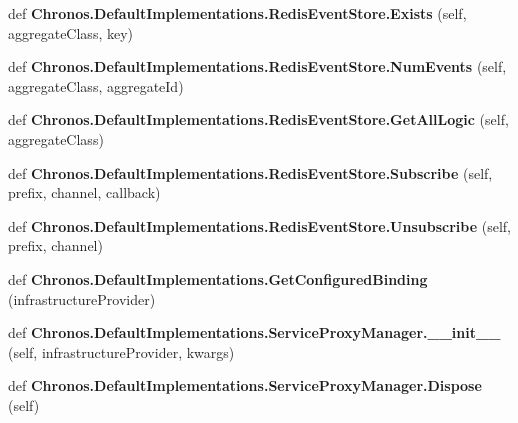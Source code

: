 \begin{DoxyCompactItemize}
\item 
def {\bfseries Chronos.\+Default\+Implementations.\+Redis\+Event\+Store.\+Exists} (self, aggregate\+Class, key)\hypertarget{group__Chronos_ga6f667d4bf5810f4b35c589062fc03772}{}\label{group__Chronos_ga6f667d4bf5810f4b35c589062fc03772}

\item 
def {\bfseries Chronos.\+Default\+Implementations.\+Redis\+Event\+Store.\+Num\+Events} (self, aggregate\+Class, aggregate\+Id)\hypertarget{group__Chronos_ga50fcc0902c963564f65c8f1f944a2fd0}{}\label{group__Chronos_ga50fcc0902c963564f65c8f1f944a2fd0}

\item 
def {\bfseries Chronos.\+Default\+Implementations.\+Redis\+Event\+Store.\+Get\+All\+Logic} (self, aggregate\+Class)\hypertarget{group__Chronos_ga984f9f6e8ed71793baf0524ffa33be09}{}\label{group__Chronos_ga984f9f6e8ed71793baf0524ffa33be09}

\item 
def {\bfseries Chronos.\+Default\+Implementations.\+Redis\+Event\+Store.\+Subscribe} (self, prefix, channel, callback)\hypertarget{group__Chronos_gab00fee59d54012849772ac3271c9f965}{}\label{group__Chronos_gab00fee59d54012849772ac3271c9f965}

\item 
def {\bfseries Chronos.\+Default\+Implementations.\+Redis\+Event\+Store.\+Unsubscribe} (self, prefix, channel)\hypertarget{group__Chronos_ga1fead1431e388a90175bc2cf79bdafbb}{}\label{group__Chronos_ga1fead1431e388a90175bc2cf79bdafbb}

\item 
def {\bfseries Chronos.\+Default\+Implementations.\+Get\+Configured\+Binding} (infrastructure\+Provider)\hypertarget{group__Chronos_ga4c40a5bf9a58687643456fa2f06de034}{}\label{group__Chronos_ga4c40a5bf9a58687643456fa2f06de034}

\item 
def {\bfseries Chronos.\+Default\+Implementations.\+Service\+Proxy\+Manager.\+\_\+\+\_\+init\+\_\+\+\_\+} (self, infrastructure\+Provider, kwargs)\hypertarget{group__Chronos_gacf0060711cfdf3c5f92e18734b7d030d}{}\label{group__Chronos_gacf0060711cfdf3c5f92e18734b7d030d}

\item 
def {\bfseries Chronos.\+Default\+Implementations.\+Service\+Proxy\+Manager.\+Dispose} (self)\hypertarget{group__Chronos_ga46bdfa25ae2b51543c99ecd77015d4ff}{}\label{group__Chronos_ga46bdfa25ae2b51543c99ecd77015d4ff}


\end{DoxyCompactItemize}
